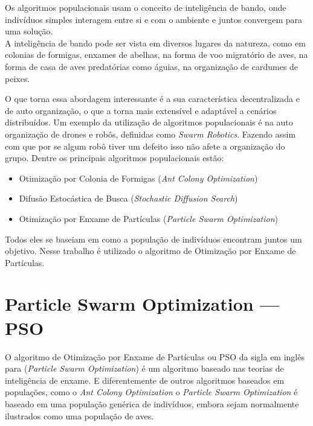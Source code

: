         Os algoritmos populacionais usam o conceito de inteligência de bando, onde indivíduos simples interagem entre si e com o ambiente e juntos convergem para uma solução.\hfill
        \\
        A inteligência de bando pode ser vista em diversos lugares da natureza, como em colonias de formigas, enxames de abelhas, na forma de voo migratório de aves, na forma de casa de aves predatórias como águias, na organização de cardumes de peixes.\hfill\vspace{\onelineskip}

        O que torna essa abordagem interessante é a sua característica decentralizada e de auto organização, o que a torna mais extensível e adaptável a cenários distribuídos. Um exemplo da utilização de algoritmos populacionais é na auto organização de drones e robôs, definidas como \textit{Swarm Robotics}. Fazendo assim com que por se algum robô tiver um defeito isso não afete a organização do grupo.\newline
        Dentre os principais algoritmos populacionais estão:
        \begin{itemize}
            \item Otimização por Colonia de Formigas (\textit{Ant Colony Optimization}) 
            \item Difusão Estocástica de Busca (\textit{Stochastic Diffusion Search})
            \item Otimização por Enxame de Partículas (\textit{Particle Swarm Optimization})
        \end{itemize}
        
        Todos eles se baseiam em como a população de indivíduos encontram juntos um objetivo. Nesse trabalho é utilizado o algoritmo de Otimização por Enxame de Partículas. 


\section{Particle Swarm Optimization — PSO}
        O algoritmo de Otimização por Enxame de Partículas ou PSO da sigla em inglês para (\textit{Particle Swarm Optimization}) é um algoritmo baseado nas teorias de inteligência de enxame. E diferentemente de outros algoritmos baseados em populações, como o \textit{Ant Colony Optimization} o \textit{Particle Swarm Optimization} é baseado em uma população genérica de indivíduos, embora sejam normalmente ilustrados como uma população de aves.


